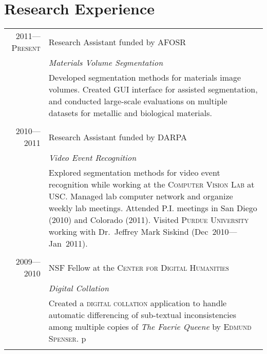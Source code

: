 \documentclass[a4paper,10pt]{article}
\begin{document}
\section{Research Experience}
\begin{tabular}{r|p{11cm}}
\textsc{2011---Present}
& Research Assistant funded by \textsc{AFOSR} \\
&\emph{Materials Volume Segmentation}\\
&\footnotesize{Developed segmentation methods for materials image volumes.  Created GUI interface for assisted segmentation, and conducted large-scale evaluations on multiple datasets for metallic and biological materials.}
\\\multicolumn{2}{c}{} \\
\textsc{2010---2011}
& Research Assistant funded by \textsc{DARPA} \\
&\emph{Video Event Recognition}\\
&\footnotesize{Explored segmentation methods for video event recognition while working at the \textsc{Computer Vision Lab} at \textsc{USC}. Managed lab computer network and organize weekly lab meetings.  Attended P.I. meetings in San Diego (2010) and Colorado (2011). Visited \textsc{Purdue University} working with Dr.~Jeffrey Mark Siskind (Dec~2010---Jan~2011).}
\\\multicolumn{2}{c}{} \\
\textsc{2009---2010}
& NSF Fellow at the \textsc{Center for Digital Humanities} \\
&\emph{Digital Collation}\\
&\footnotesize{Created a \textsc{digital collation} application to handle automatic differencing of sub-textual inconsistencies among multiple copies of \emph{The Faerie Queene} by \textsc{Edmund Spenser}.}
p\\\multicolumn{2}{c}{} \\
\end{tabular}

\pagebreak
\end{document}

